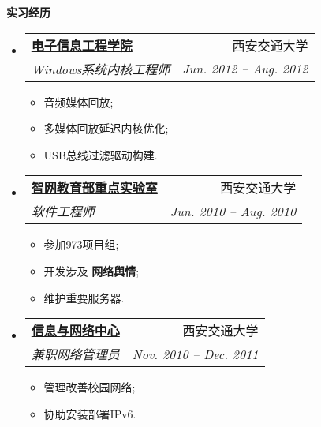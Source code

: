 \documentclass[letterpaper,11pt]{article}
\makeatletter
\newcommand{\resitem}[1]{\item #1 \vspace{-2pt}}
\newcommand{\resheading}[1]{{\large \colorbox{mygrey}{\begin{minipage}{\textwidth}{\textbf{#1 \vphantom{p\^{E}}}}\end{minipage}}}}
\newcommand{\ressubheading}[4]{
\begin{tabular*}{6.5in}{l@{\extracolsep{\fill}}r}
		\textbf{#1} & #2 \\
		\textit{#3} & \textit{#4} \\
\end{tabular*}\vspace{-6pt}}
\makeatother
\begin{document}
\begin{CJK}{UTF8}{gbsn}
\resheading{实习经历}
	\begin{itemize}
		\item 
			\ressubheading{\href{http://eie.xjtu.edu.cn/}{电子信息工程学院}}{西安交通大学}{Windows系统内核工程师}{Jun. 2012 -- Aug. 2012}
				{ \footnotesize
				\begin{itemize}
					\resitem{音频媒体回放;}
					\resitem{多媒体回放延迟内核优化;}
					\resitem{USB总线过滤驱动构建.}
				\end{itemize}
				}
		\item 
			\ressubheading{\href{http://nskeylab.xjtu.edu.cn/}{智网教育部重点实验室}}{西安交通大学}{软件工程师}{Jun. 2010 -- Aug. 2010}
				{ \footnotesize
				\begin{itemize}
					\resitem{参加973项目组;}
					\resitem{开发涉及 \textbf{网络舆情};}
					\resitem{维护重要服务器.}
				\end{itemize}
				}
		\item
			\ressubheading{\href{http://nic.xjtu.edu.cn}{信息与网络中心}}{西安交通大学}{兼职网络管理员}{Nov. 2010 -- Dec. 2011}
				{ \footnotesize
				\begin{itemize}
					\resitem{管理改善校园网络;}
					\resitem{协助安装部署IPv6.}
				\end{itemize}
          		}
	\end{itemize}
	

\end{CJK}
\end{document}
